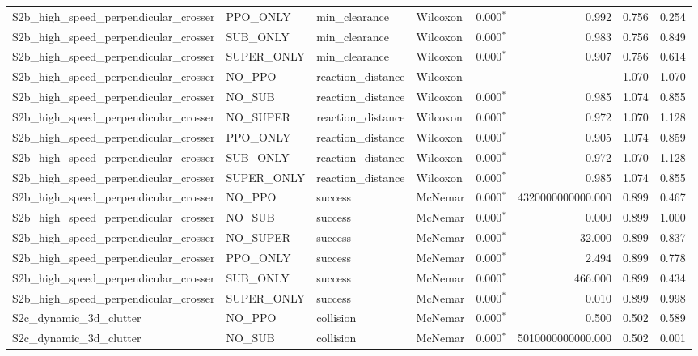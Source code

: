 \begin{tabular}{llllrrrl}
  S2b_high_speed_perpendicular_crosser & PPO_ONLY & min_clearance & Wilcoxon & 0.000$^{*}$ & 0.992 & 0.756 & 0.254 \\
  S2b_high_speed_perpendicular_crosser & SUB_ONLY & min_clearance & Wilcoxon & 0.000$^{*}$ & 0.983 & 0.756 & 0.849 \\
  S2b_high_speed_perpendicular_crosser & SUPER_ONLY & min_clearance & Wilcoxon & 0.000$^{*}$ & 0.907 & 0.756 & 0.614 \\
  S2b_high_speed_perpendicular_crosser & NO_PPO & reaction_distance & Wilcoxon & --- & --- & 1.070 & 1.070 \\
  S2b_high_speed_perpendicular_crosser & NO_SUB & reaction_distance & Wilcoxon & 0.000$^{*}$ & 0.985 & 1.074 & 0.855 \\
  S2b_high_speed_perpendicular_crosser & NO_SUPER & reaction_distance & Wilcoxon & 0.000$^{*}$ & 0.972 & 1.070 & 1.128 \\
  S2b_high_speed_perpendicular_crosser & PPO_ONLY & reaction_distance & Wilcoxon & 0.000$^{*}$ & 0.905 & 1.074 & 0.859 \\
  S2b_high_speed_perpendicular_crosser & SUB_ONLY & reaction_distance & Wilcoxon & 0.000$^{*}$ & 0.972 & 1.070 & 1.128 \\
  S2b_high_speed_perpendicular_crosser & SUPER_ONLY & reaction_distance & Wilcoxon & 0.000$^{*}$ & 0.985 & 1.074 & 0.855 \\
  S2b_high_speed_perpendicular_crosser & NO_PPO & success & McNemar & 0.000$^{*}$ & 4320000000000.000 & 0.899 & 0.467 \\
  S2b_high_speed_perpendicular_crosser & NO_SUB & success & McNemar & 0.000$^{*}$ & 0.000 & 0.899 & 1.000 \\
  S2b_high_speed_perpendicular_crosser & NO_SUPER & success & McNemar & 0.000$^{*}$ & 32.000 & 0.899 & 0.837 \\
  S2b_high_speed_perpendicular_crosser & PPO_ONLY & success & McNemar & 0.000$^{*}$ & 2.494 & 0.899 & 0.778 \\
  S2b_high_speed_perpendicular_crosser & SUB_ONLY & success & McNemar & 0.000$^{*}$ & 466.000 & 0.899 & 0.434 \\
  S2b_high_speed_perpendicular_crosser & SUPER_ONLY & success & McNemar & 0.000$^{*}$ & 0.010 & 0.899 & 0.998 \\
  S2c_dynamic_3d_clutter & NO_PPO & collision & McNemar & 0.000$^{*}$ & 0.500 & 0.502 & 0.589 \\
  S2c_dynamic_3d_clutter & NO_SUB & collision & McNemar & 0.000$^{*}$ & 5010000000000.000 & 0.502 & 0.001 \\

\end{tabular}
